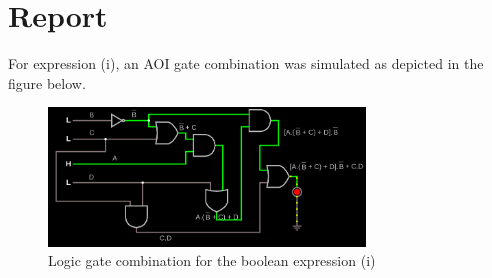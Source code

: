 \documentclass{article}
\begin{document}
	\section*{Report}
	For expression (i), an AOI gate combination was simulated as depicted in the figure below.
	\begin{figure}[H]
		\centering
		\includegraphics[width=0.75\textwidth]{one}
		\caption{Logic gate combination for the boolean expression (i)}
		\label{circuit1}
	\end{figure}
	 
\end{document}
